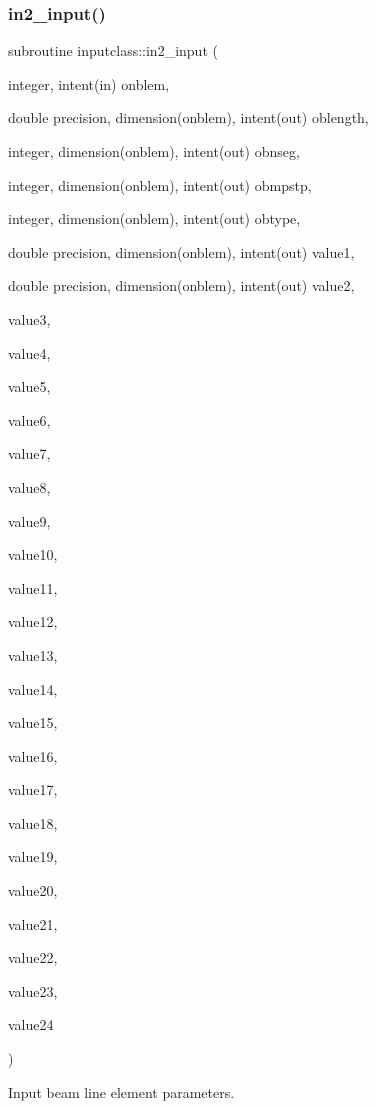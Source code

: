 \subsubsection{\texorpdfstring{in2\_input()}{in2\_input()}}
{\footnotesize\ttfamily subroutine inputclass\+::in2\+\_\+input (\begin{DoxyParamCaption}\item[{integer, intent(in)}]{onblem,  }\item[{double precision, dimension(onblem), intent(out)}]{oblength,  }\item[{integer, dimension(onblem), intent(out)}]{obnseg,  }\item[{integer, dimension(onblem), intent(out)}]{obmpstp,  }\item[{integer, dimension(onblem), intent(out)}]{obtype,  }\item[{double precision, dimension(onblem), intent(out)}]{value1,  }\item[{double precision, dimension(onblem), intent(out)}]{value2,  }\item[{}]{value3,  }\item[{}]{value4,  }\item[{}]{value5,  }\item[{}]{value6,  }\item[{}]{value7,  }\item[{}]{value8,  }\item[{}]{value9,  }\item[{}]{value10,  }\item[{}]{value11,  }\item[{}]{value12,  }\item[{}]{value13,  }\item[{}]{value14,  }\item[{}]{value15,  }\item[{}]{value16,  }\item[{}]{value17,  }\item[{}]{value18,  }\item[{}]{value19,  }\item[{}]{value20,  }\item[{}]{value21,  }\item[{}]{value22,  }\item[{}]{value23,  }\item[{}]{value24 }\end{DoxyParamCaption})}



Input beam line element parameters. 

